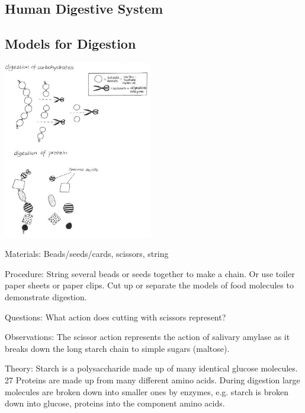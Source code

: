 \begin{multicols}{2}

\section*{Human Digestive System}


\subsection{Models for Digestion} %

\begin{center}
\includegraphics[width=0.49\textwidth]{./img/vso/digestion-models.jpg}
\end{center}

\begin{description*}
\item[Materials:]{Beads/seeds/cards, scissors, string}
\item[Procedure:]{String several beads or seeds together to make a chain. Or use toiler paper sheets or paper clips. Cut up or separate the models of food molecules to
demonstrate digestion.}
\item[Questions:]{What action does cutting with scissors represent?}
\item[Observations:]{The scissor action represents the action of salivary amylase as it breaks down the long
starch chain to simple sugars (maltose).}
\item[Theory:]{Starch is a polysaccharide made up of many identical glucose molecules. 27
Proteins are made up from many different amino acids. During
digestion large molecules are broken down into smaller ones by
enzymes, e.g. starch is broken down into glucose, proteins into the
component amino acids.}
\end{description*}


\end{multicols}
